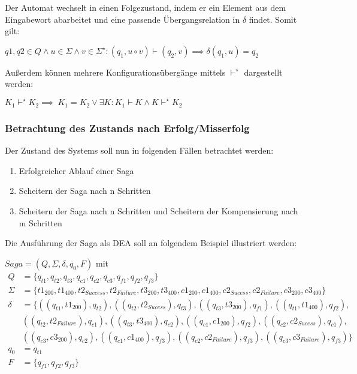 Der Automat wechselt in einen Folgezustand, indem er ein Element aus dem Eingabewort abarbeitet und eine passende Übergangsrelation in $\delta$ findet. Somit gilt:

\begin{center}
$q1, q2 \in Q \land u \in \Sigma \land v \in \Sigma^{\star}: (q_{1}, u \circ v)\vdash (q_{2}, v) \implies \delta(q_{1}, u) = q_{2}$
\end{center}

Außerdem können mehrere Konfigurationsübergänge mittels $\vdash^{\star}$ dargestellt werden:

\begin{center}
$K_1 \vdash^{\star} K_2 \implies \ K_1 = K_2 \lor \exists K: K_1 \vdash K \land K \vdash^{\star} K_2$
\end{center}

\subsubsection{Betrachtung des Zustands nach Erfolg/Misserfolg}
Der Zustand des Systems soll nun in folgenden Fällen betrachtet werden:
\begin{enumerate}%
	\item Erfolgreicher Ablauf einer Saga
	\item Scheitern der Saga nach n Schritten
	\item Scheitern der Saga nach n Schritten und Scheitern der Kompensierung nach m Schritten
\end{enumerate}

Die Ausführung der Saga als DEA soll an folgendem Beispiel illustriert werden:

$Saga = (Q, \Sigma, \delta, q_0, F)$ mit
\begin{align*}
Q &= \{q_{t1}, q_{t2}, q_{t3}, q_{c1}, q_{c2}, q_{c3}, q_{f1}, q_{f2}, q_{f3}\}\\
\Sigma &= \{t1_{200}, t1_{400}, t2_{Success}, t2_{Failure}, t3_{200}, t3_{400}, c1_{200}, c1_{400}, c2_{Sucess}, c2_{Failure}, c3_{200}, c3_{400}\}\\
\delta &= \{((q_{t1}, t1_{200}), q_{t2}), 
((q_{t2}, t2_{Sucess}), q_{t3}), 
((q_{t3}, t3_{200}), q_{f1}), 
((q_{t1}, t1_{400}), q_{f2}), \\
&((q_{t2}, t2_{Failure}), q_{c1}), 
((q_{t3}, t3_{400}), q_{c2}), 
((q_{c1}, c1_{200}), q_{f2}), 
((q_{c2}, c2_{Sucess}), q_{c1}),\\ 
&((q_{c3}, c3_{200}), q_{c2}), 
((q_{c1}, c1_{400}), q_{f3}), 
((q_{c2}, c2_{Failure}), q_{f3}), 
((q_{c3}, c3_{Failure}), q_{f3})\} \\
q_0 &= q_{t1}\\
F &= \{q_{f1}, q_{f2}, q_{f3}\}
\end{align*}


